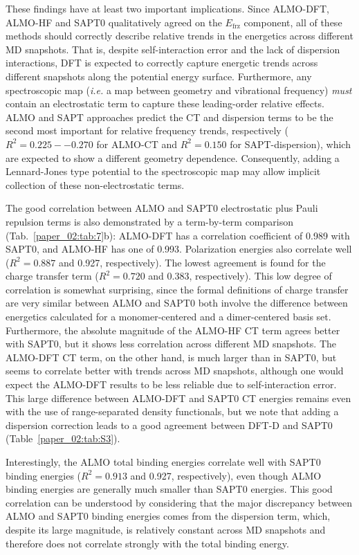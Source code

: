 \documentclass[%
  class = book,%
  crop = false,%
  float = true,%
  multi = true,%
  preview = false,%
]{standalone}
\begin{document}
These findings have at least two important implications. Since ALMO-DFT, ALMO-HF and SAPT0 qualitatively agreed on the \(E_{\text{frz}}\) component, all of these methods should correctly describe relative trends in the energetics across different MD snapshots. That is, despite self-interaction error and the lack of dispersion interactions, DFT is expected to correctly capture energetic trends across different snapshots along the potential energy surface. Furthermore, any spectroscopic map (\emph{i.e.} a map between  geometry and vibrational frequency) \emph{must} contain an electrostatic term to capture these leading-order relative effects. ALMO and SAPT approaches predict the CT and dispersion terms to be the second most important for relative frequency trends, respectively (\(R^2 = 0.225 -- 0.270\) for ALMO-CT and \(R^2 = 0.150\) for SAPT-dispersion), which are expected to show a different geometry dependence. Consequently, adding a Lennard-Jones type potential to the spectroscopic map may allow implicit collection of these non-electrostatic terms.

The good correlation between ALMO and SAPT0 electrostatic plus Pauli repulsion terms is also demonstrated by a term-by-term comparison (Tab.~\ref{paper_02:tab:7}b): ALMO-DFT has a correlation coefficient of \num{0.989} with SAPT0, and ALMO-HF has one of \num{0.993}. Polarization energies also correlate well (\(R^2 = 0.887\) and \num{0.927}, respectively). The lowest agreement is found for the charge transfer term (\(R^2 = 0.720\) and \num{0.383}, respectively). This low degree of correlation is somewhat surprising, since the formal definitions of charge transfer are very similar between ALMO and SAPT0 \textemdash{} both involve the difference between energetics calculated for a monomer-centered and a dimer-centered basis set. Furthermore, the absolute magnitude of the ALMO-HF CT term agrees better with SAPT0, but it shows less correlation across different MD snapshots. The ALMO-DFT CT term, on the other hand, is much larger than in SAPT0, but seems to correlate better with trends across MD snapshots, although one would expect the ALMO-DFT results to be less reliable due to self-interaction error. This large difference between ALMO-DFT and SAPT0 CT energies remains even with the use of range-separated density functionals, but we note that adding a dispersion correction leads to a good agreement between DFT-D and SAPT0 (Table~\ref{paper_02:tab:S3}).

Interestingly, the ALMO total binding energies correlate well with SAPT0 binding energies (\(R^2 = 0.913\) and \num{0.927}, respectively), even though ALMO binding energies are generally much smaller than SAPT0 energies. This good correlation can be understood by considering that the major discrepancy between ALMO and SAPT0 binding energies comes from the dispersion term, which, despite its large magnitude, is relatively constant across MD snapshots and therefore does not correlate strongly with the total binding energy.
\end{document}
